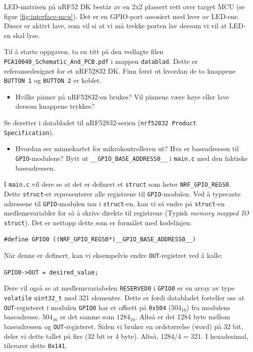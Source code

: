 LED-matrisen på nRF52 DK består av en 2x2 plassert rett over target MCU (se figur \ref{fig:interface-mcu}). Det er en GPIO-port assosiert med hver av LED-ene. Disser er aktivt lave, som vil si at vi må trekke porten lav dersom vi vil at LED-en skal lyse.

Til å starte oppgaven, ta en titt på den vedlagte filen \verb|PCA10040_Schematic_And_PCB.pdf| i mappen \verb|datablad|. Dette er referansedesignet for et nRF52832 DK. Finn først ut hvordan de to knappene \verb|BUTTON 1| og \verb|BUTTON 2| er koblet. 

\begin{itemize}
    \item Hvilke pinner på nRF52832-en brukes? Vil pinnene være høye eller lave dersom knappene trykkes?
\end{itemize}


Se deretter i databladet til nRF52832-serien (\texttt{nrf52832 Product Specification}). 

\begin{itemize}
    \item Hvordan ser minnekartet for mikrokontrolleren ut? Hva er baseadressen til \verb|GPIO|-modulene? Bytt ut \verb|__GPIO_BASE_ADDRESS0__| i \verb|main.c| med den faktiske baseadressen. 
\end{itemize}

I \verb|main.c| vil dere se at det er definert et \verb|struct| som heter \verb|NRF_GPIO_REGS0|. Dette \verb|struct|-et representerer alle registrene til \verb|GPIO|-modulen. Ved å typecaste adressene til \verb|GPIO|-modulen inn i \verb|struct|-en, kan vi så endre på \verb|struct|-en medlemsvariabler for så å skrive direkte til registrene (Typisk \textit{memory mapped IO} \verb|struct|). Det er nettopp dette som er formålet med kodelinjen:

\verb|#define GPIO0 ((NRF_GPIO_REGS0*)__GPIO_BASE_ADDRESS0__)|

Når denne er definert, kan vi eksempelvis endre \verb|OUT|-registret ved å kalle:

\verb|GPIO0->OUT = desired_value;|\newline

 Dere vil også se at medlemsvariabelen \verb|RESERVED0| i \verb|GPIO0| er en array av type \verb|volatile| \verb|uint32_t| med 321 elementer. Dette er fordi databladet forteller oss at \verb|OUT|-registeret i modulen \verb|GPIO0| har et offsett på 
 \verb|0x504| ($\text{504}_{\text{16}}$) fra modulens baseadresse. $\text{504}_{\text{16}}$ er det samme som $\text{1284}_{\text{10}}$. Altså er det 1284 byte mellom baseadressen og \verb|OUT|-registeret. Siden vi bruker en ordstørrelse (word) på 32 bit, deler vi dette tallet på fire (32 bit er 4 byte). Altså, 1284/4 = 321. I hexadesimal, tilsvarer dette \verb|0x141|.

